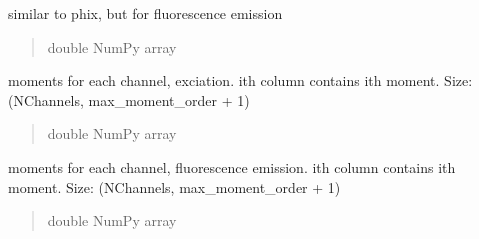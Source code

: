 \documentclass[letterpaper,10pt,english]{sphinxmanual}
\begin{document}
\begin{fulllineitems}

\begin{fulllineitems}
\label{\detokenize{_autosummary/nirfasterff.base.data.flTRMomentsdata:nirfasterff.base.data.flTRMomentsdata.phifl}}
\pysigstartsignatures
\pysigline
{}
\pysigstopsignatures
\sphinxAtStartPar
similar to phix, but for fluorescence emission
\begin{quote}\begin{description}
\sphinxAtStartPar
double NumPy array

\end{description}\end{quote}

\end{fulllineitems}


\begin{fulllineitems}
\label{\detokenize{_autosummary/nirfasterff.base.data.flTRMomentsdata:nirfasterff.base.data.flTRMomentsdata.momentsx}}
\pysigstartsignatures
\pysigline
{}
\pysigstopsignatures
\sphinxAtStartPar
moments for each channel, exciation. i\sphinxhyphen{}th column contains i\sphinxhyphen{}th moment. Size: (NChannels, max\_moment\_order + 1)
\begin{quote}\begin{description}
\sphinxAtStartPar
double NumPy array

\end{description}\end{quote}

\end{fulllineitems}


\begin{fulllineitems}
\label{\detokenize{_autosummary/nirfasterff.base.data.flTRMomentsdata:nirfasterff.base.data.flTRMomentsdata.momentsfl}}
\pysigstartsignatures
\pysigline
{}
\pysigstopsignatures
\sphinxAtStartPar
moments for each channel, fluorescence emission. i\sphinxhyphen{}th column contains i\sphinxhyphen{}th moment. Size: (NChannels, max\_moment\_order + 1)
\begin{quote}\begin{description}
\sphinxAtStartPar
double NumPy array


\end{description}
\end{quote}
\end{fulllineitems}
\end{fulllineitems}
\end{document}
